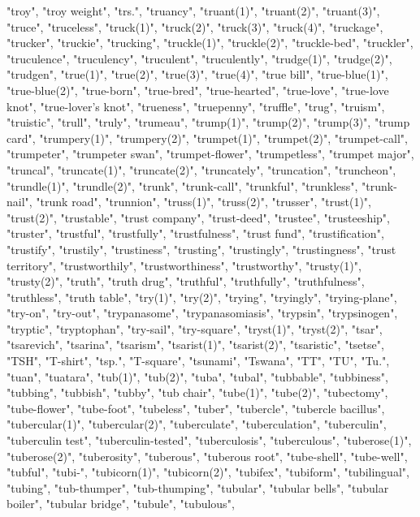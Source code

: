"troy",
"troy weight",
"trs.",
"truancy",
"truant(1)",
"truant(2)",
"truant(3)",
"truce",
"truceless",
"truck(1)",
"truck(2)",
"truck(3)",
"truck(4)",
"truckage",
"trucker",
"truckie",
"trucking",
"truckle(1)",
"truckle(2)",
"truckle-bed",
"truckler",
"truculence",
"truculency",
"truculent",
"truculently",
"trudge(1)",
"trudge(2)",
"trudgen",
"true(1)",
"true(2)",
"true(3)",
"true(4)",
"true bill",
"true-blue(1)",
"true-blue(2)",
"true-born",
"true-bred",
"true-hearted",
"true-love",
"true-love knot",
"true-lover's knot",
"trueness",
"truepenny",
"truffle",
"trug",
"truism",
"truistic",
"trull",
"truly",
"trumeau",
"trump(1)",
"trump(2)",
"trump(3)",
"trump card",
"trumpery(1)",
"trumpery(2)",
"trumpet(1)",
"trumpet(2)",
"trumpet-call",
"trumpeter",
"trumpeter swan",
"trumpet-flower",
"trumpetless",
"trumpet major",
"truncal",
"truncate(1)",
"truncate(2)",
"truncately",
"truncation",
"truncheon",
"trundle(1)",
"trundle(2)",
"trunk",
"trunk-call",
"trunkful",
"trunkless",
"trunk-nail",
"trunk road",
"trunnion",
"truss(1)",
"truss(2)",
"trusser",
"trust(1)",
"trust(2)",
"trustable",
"trust company",
"trust-deed",
"trustee",
"trusteeship",
"truster",
"trustful",
"trustfully",
"trustfulness",
"trust fund",
"trustification",
"trustify",
"trustily",
"trustiness",
"trusting",
"trustingly",
"trustingness",
"trust territory",
"trustworthily",
"trustworthiness",
"trustworthy",
"trusty(1)",
"trusty(2)",
"truth",
"truth drug",
"truthful",
"truthfully",
"truthfulness",
"truthless",
"truth table",
"try(1)",
"try(2)",
"trying",
"tryingly",
"trying-plane",
"try-on",
"try-out",
"trypanasome",
"trypanasomiasis",
"trypsin",
"trypsinogen",
"tryptic",
"tryptophan",
"try-sail",
"try-square",
"tryst(1)",
"tryst(2)",
"tsar",
"tsarevich",
"tsarina",
"tsarism",
"tsarist(1)",
"tsarist(2)",
"tsaristic",
"tsetse",
"TSH",
"T-shirt",
"tsp.",
"T-square",
"tsunami",
"Tswana",
"TT",
"TU",
"Tu.",
"tuan",
"tuatara",
"tub(1)",
"tub(2)",
"tuba",
"tubal",
"tubbable",
"tubbiness",
"tubbing",
"tubbish",
"tubby",
"tub chair",
"tube(1)",
"tube(2)",
"tubectomy",
"tube-flower",
"tube-foot",
"tubeless",
"tuber",
"tubercle",
"tubercle bacillus",
"tubercular(1)",
"tubercular(2)",
"tuberculate",
"tuberculation",
"tuberculin",
"tuberculin test",
"tuberculin-tested",
"tuberculosis",
"tuberculous",
"tuberose(1)",
"tuberose(2)",
"tuberosity",
"tuberous",
"tuberous root",
"tube-shell",
"tube-well",
"tubful",
"tubi-",
"tubicorn(1)",
"tubicorn(2)",
"tubifex",
"tubiform",
"tubilingual",
"tubing",
"tub-thumper",
"tub-thumping",
"tubular",
"tubular bells",
"tubular boiler",
"tubular bridge",
"tubule",
"tubulous",
